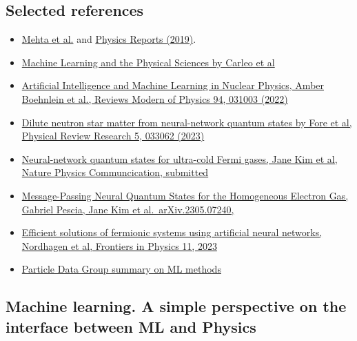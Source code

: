 \documentclass[%
oneside,                 %
final,                   %
10pt]{article}
\begin{document}
\subsection{Selected references}
\begin{block}{}
\begin{itemize}
\item \href{{https://arxiv.org/abs/1803.08823}}{Mehta et al.} and \href{{https://www.sciencedirect.com/science/article/pii/S0370157319300766?via%3Dihub}}{Physics Reports (2019)}.

\item \href{{https://link.aps.org/doi/10.1103/RevModPhys.91.045002}}{Machine Learning and the Physical Sciences by Carleo et al}

\item \href{{https://journals.aps.org/rmp/abstract/10.1103/RevModPhys.94.031003}}{Artificial Intelligence and Machine Learning in Nuclear Physics, Amber Boehnlein et al., Reviews Modern of Physics 94, 031003 (2022)} 

\item \href{{https://journals.aps.org/prresearch/pdf/10.1103/PhysRevResearch.5.033062}}{Dilute neutron star matter from neural-network quantum states by Fore et al, Physical Review Research 5, 033062 (2023)}

\item \href{{https://doi.org/10.48550/arXiv.2305.08831}}{Neural-network quantum states for ultra-cold Fermi gases, Jane Kim et al, Nature Physics Communcication, submitted}

\item \href{{https://doi.org/10.48550/arXiv.2305.07240}}{Message-Passing Neural Quantum States for the Homogeneous Electron Gas, Gabriel Pescia, Jane Kim et al.~arXiv.2305.07240,}

\item \href{{https://doi.org/10.3389/fphy.2023.1061580}}{Efficient solutions of fermionic systems using artificial neural networks, Nordhagen et al, Frontiers in Physics 11, 2023}

\item \href{{https://pdg.lbl.gov/2021/reviews/rpp2021-rev-machine-learning.pdf}}{Particle Data Group summary on ML methods}
\end{itemize}

\noindent
\end{block}

\subsection{Machine learning. A simple perspective on the interface between ML and Physics}
\end{document}
